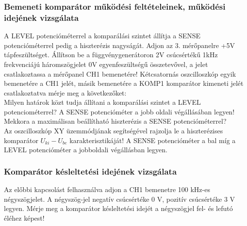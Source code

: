 \documentclass[10pt,a4paper]{article}
\begin{document}
	\subsubsection{Bemeneti komparátor működési feltételeinek, működési idejének vizsgálata}
	A LEVEL potencióméterrel a komparálási szintet állítja a SENSE
potencióméterrel pedig a hiszterézis nagyságát.
Adjon az 3. mérőpanelre +5V tápfeszültséget. Állítson be a
függvénygenerátoron 2V csúcsértékű 1kHz frekvenciájú háromszögjelet 0V
egyenfeszültségű összetevővel, a jelet csatlakoztassa a mérőpanel CH1
bemenetére! Kétcsatornás oszcilloszkóp egyik bemenetére a CH1 jelét, másik bemenetére
a KOMP1 komparátor kimeneti jelét csatlakoztatva mérje meg a
következőket: $$$$
	Milyen határok közt tudja állítani a komparálási szintet a LEVEL
potenciométerrel? A SENSE potencióméter a jobb oldali végállásában
legyen! $$$$ $$$$ $$$$
	Mekkora a maximálisan beállítható hiszterézis a SENSE potencióméterrel?
	$$$$
	$$$$
	Az oszcilloszkóp XY üzemmódjának segítségével rajzolja le a
hiszterézises komparátor $U_{ki}-U_{be}$ karakterisztikáját! A SENSE
potencióméter a bal míg a LEVEL potencióméter a jobboldali
végállásban legyen.\newpage
\subsubsection{Komparátor késleltetési idejének vizsgálata}
	Az előbbi kapcsolást felhasználva adjon a CH1 bemenetre 100 kHz-es
négyszögjelet. A négyszög-jel negatív csúcsértéke 0 V, pozitív csúcsértéke 3
V legyen.
Mérje meg a komparátor késleltetési idejét a négyszögjel fel- és lefutó éléhez
képest! 
\end{document}
